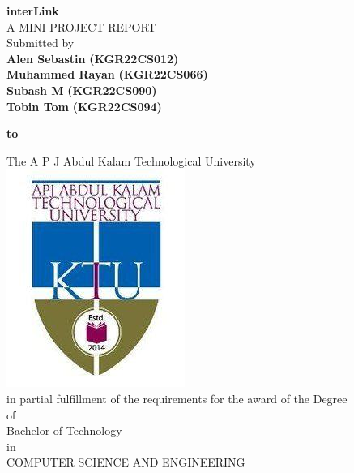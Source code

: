 \documentclass[twoside,a4paper,openright]{report} %
\begin{document}
	
	
	
	
	\begin{center}
		
		{\Large \textbf{interLink}}\\
		
		A MINI PROJECT REPORT\\
		\vspace{1cm}  %
		Submitted by \\
		\vspace{0.6cm}   %
		\textbf{Alen Sebastin} \textbf{(KGR22CS012)}\\
		\vspace{0.3cm}   %
		\textbf{Muhammed Rayan } \textbf{(KGR22CS066)}\\
		\vspace{0.3cm}   %
		\textbf{Subash M } \textbf{(KGR22CS090)}\\
		\vspace{0.3cm}   %
		\textbf{Tobin Tom } \textbf{(KGR22CS094)}\\
		\vspace{0.6cm}   %
		
		\textbf{to}\\
		\vspace{0.8cm}   %
		
		The A P J Abdul Kalam Technological University \\
		\vspace{0.6cm}\hspace{0.3cm}\includegraphics[scale=0.3]{ktu.jpg} \\
		in partial fulfillment of the requirements for the award of the Degree \\
		\vspace{0.6cm}   %
		of\\
		\vspace{0.6cm}   %
		Bachelor of Technology \\
		\vspace{0.6cm}   %
		in\\
		\vspace{0.6cm}   %
		COMPUTER SCIENCE AND ENGINEERING
	\end{center}
	
\end{document}
